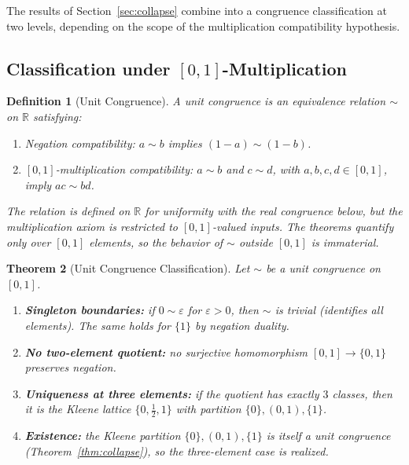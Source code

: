 \documentclass[11pt,a4paper]{article}
\newtheorem{theorem}{Theorem}[section]
\newtheorem{definition}[theorem]{Definition}
\begin{document}
The results of Section~\ref{sec:collapse} combine into a congruence
classification at two levels, depending on the scope of the
multiplication compatibility hypothesis.

\subsection{Classification under $[0,1]$-Multiplication}

\begin{definition}[Unit Congruence]
\label{def:unit-congruence}
A \emph{unit congruence} is an equivalence relation $\sim$ on
$\mathbb{R}$ satisfying:
\begin{enumerate}[label=(\roman*),nosep]
\item \emph{Negation compatibility:} $a \sim b$ implies
  $(1 - a) \sim (1 - b)$.
\item \emph{$[0,1]$-multiplication compatibility:}
  $a \sim b$ and $c \sim d$, with $a,b,c,d \in [0,1]$, imply
  $ac \sim bd$.
\end{enumerate}
The relation is defined on $\mathbb{R}$ for uniformity with the
real congruence below, but the multiplication axiom is restricted to
$[0,1]$-valued inputs.
The theorems quantify only over $[0,1]$ elements, so the behavior
of $\sim$ outside $[0,1]$ is immaterial.
\end{definition}

\begin{theorem}[Unit Congruence Classification]
\label{thm:unit-classification}
Let $\sim$ be a unit congruence on $[0,1]$.
\begin{enumerate}[label=\textup{(\arabic*)}]
\item \textbf{Singleton boundaries:}
  if $0 \sim \varepsilon$ for $\varepsilon > 0$, then $\sim$ is
  trivial (identifies all elements).
  The same holds for $\{1\}$ by negation duality.
\item \textbf{No two-element quotient:}
  no surjective homomorphism $[0,1] \to \{0,1\}$ preserves negation.
\item \textbf{Uniqueness at three elements:}
  if the quotient has exactly $3$ classes, then it is the Kleene lattice
  $\{0, \tfrac{1}{2}, 1\}$ with partition $\{0\},(0,1),\{1\}$.
\item \textbf{Existence:}
  the Kleene partition $\{0\},(0,1),\{1\}$ is itself a unit
  congruence (Theorem~\ref{thm:collapse}), so the three-element case
  is realized.
\end{enumerate}
\end{theorem}
\end{document}
